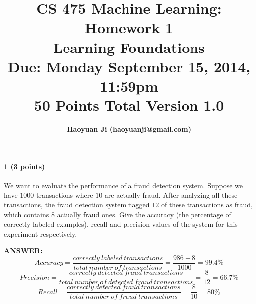 \documentclass[11pt]{article}
\title{CS 475 Machine Learning: Homework 1\\Learning Foundations\\
\Large{Due: Monday September 15, 2014, 11:59pm}\\
50 Points Total \hspace{1cm} Version 1.0}
\author{\textbf{Haoyuan Ji (haoyuanji@gmail.com)}}
\date{}
\begin{document}
\large
\maketitle
\thispagestyle{headings}

\vspace{-.5in}




\paragraph{1 (3 points)} We want to evaluate the performance of a fraud detection system. Suppose we have $1000$ transactions where $10$ are actually fraud. After analyzing all these transactions, the fraud detection system flagged $12$ of these transactions as fraud, which contains $8$ actually fraud ones. Give the accuracy (the percentage of correctly labeled examples), recall and precision values of the system for this experiment respectively.
\par \textbf{ANSWER:}
\begin{equation}
Accuracy = \frac {correctly\ labeled\ transactions }{ total\ number\ of\ transactions} = \frac{986 + 8}{1000} = 99.4 \%
\end{equation}
\begin{equation}
Precision = \frac {correctly\ detected\ fraud\ transactions }{ total\ number\ of\ detected\ fraud\ transactions} = \frac{8}{12} = 66.7 \%
\end{equation}
\begin{equation}
Recall = \frac {correctly\ detected\ fraud\ transactions }{ total\ number\ of\ fraud\ transactions} = \frac{8}{10} = 80 \%
\end{equation}
\end{document}

